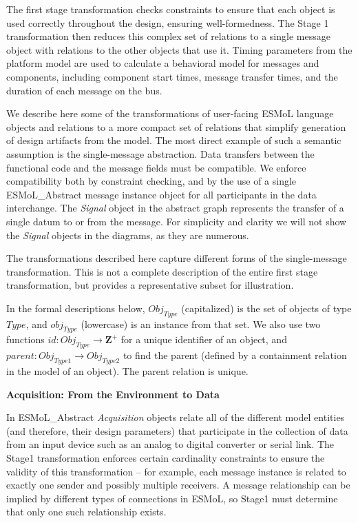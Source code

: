 The first stage transformation checks constraints to ensure that each object 
is used correctly throughout the design, ensuring well-formedness.  
The Stage 1 transformation then reduces this complex set of relations
to a single message object with relations to the other objects that use it. 
Timing parameters from the platform model are used to calculate a behavioral
model for messages and components, including component start times, message 
transfer times, and the duration of each message on the bus.

We describe here some of the transformations of user-facing 
ESMoL language objects and
relations to a more compact set of relations that simplify generation of design
artifacts from the model.  The most direct example of such a semantic assumption
is the single-message abstraction.  Data transfers between the functional code
and the message fields must be compatible. We enforce compatibility 
both by constraint
checking, and by the use of a single ESMoL\_Abstract message instance 
object for all
participants in the data interchange.  The \emph{Signal} object in the
abstract graph represents the transfer of a single datum to or from the message.
For simplicity and clarity we will not show the \emph{Signal} objects in the diagrams, as they are numerous.

The transformations described here capture different forms of the
single-message transformation.  This is not a complete description of the
entire first stage transformation, but provides a representative subset for
illustration.

In the formal descriptions below, $Obj_{Type}$ (capitalized) is the set of objects of type $Type$, and
$obj_{Type}$ (lowercase) is an instance from that set.  We also
use two functions $id: Obj_{Type} \rightarrow \mathbf{Z}^{+}$ for a unique
identifier of an object, and $parent: Obj_{Type1} \rightarrow Obj_{Type2}$ to
find the parent (defined by a containment relation in the model of an object).
The parent relation is unique.

\textbf{Acquisition: From the Environment to Data}

In ESMoL\_Abstract \emph{Acquisition} objects relate all of the different model entities (and
therefore, their design parameters) that participate in the collection of data
from an input device such as an analog to digital converter or serial link. 
The Stage1 transformation enforces certain cardinality constraints to ensure
the validity of this transformation -- for example, each message instance is 
related to exactly one sender and possibly multiple receivers.  A message 
relationship can be implied by different types of connections in ESMoL, so 
Stage1 must determine that only one such relationship exists.

